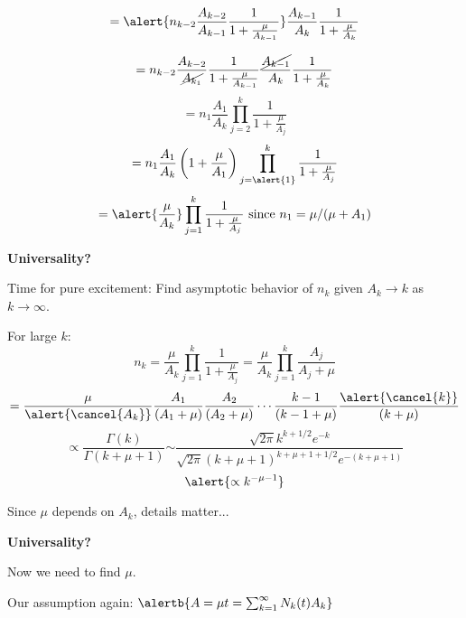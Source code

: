 \begin{frame}[label=]
\begin{frame}[label=]
\begin{frame}[label=]
\begin{frame}[label=]
\begin{frame}[label=]
\begin{frame}[label=]
\begin{frame}[label=]
\begin{frame}[label=]
\begin{frame}[label=]
\begin{frame}[label=]
\begin{frame}[label=]
\begin{frame}[label=]
\begin{frame}[label=]
\begin{frame}[label=]
\begin{frame}[label=]
\begin{frame}[label=]
\begin{frame}[label=]
\begin{frame}[label=]
\begin{frame}[label=]
\begin{frame}[label=]
\begin{frame}[label=]
\begin{frame}[label=]
\begin{frame}[label=]
\begin{frame}[label=]
\begin{overprint}
      $$
      =
      \alert{n_{k-2}
        \frac{A_{k-2}}{A_{k-1}}
        \frac{1}{1 + \frac{\mu}{A_{k-1}}}}
      \frac{A_{k-1}}{A_k}
      \frac{1}{1 + \frac{\mu}{A_k}}
      $$
      
      $$
      =
      n_{k-2}
      \frac{A_{k-2}}{\cancel{A_{k_1}}}
      \frac{1}{1 + \frac{\mu}{A_{k-1}}}
      \frac{\cancel{A_{k-1}}}{A_k}
      \frac{1}{1 + \frac{\mu}{A_k}}
      $$
        {
      $$
      =
      n_{1}
      \frac{A_{1}}{A_k}
      \prod_{j=2}^{k}
      \frac{1}{1 + \frac{\mu}{A_j}}
      $$
    }
    {
      $$
      =
      n_{1}
      \frac{A_{1}}{A_k}
      \left(1 + \frac{\mu}{A_1}\right)
      \prod_{j=\alert{1}}^{k}
      \frac{1}{1 + \frac{\mu}{A_j}}
      $$
    }
    {
      $$
      =
      \alert{\frac{\mu}{A_k}}
      \prod_{j=1}^{k}
      \frac{1}{1 + \frac{\mu}{A_j}}
      \mbox{\ since $n_1 = \mu/(\mu+A_1)$}
      $$
    }
  


  \textbf{Universality?}

  
  
    Time for pure excitement: Find \alert{asymptotic behavior} 
    of $n_k$ given $A_k \rightarrow k$ as $k \rightarrow \infty$.
  
    For large $k$:
    $$
    n_k = 
    \frac{\mu}{A_k}
    \prod_{j=1}^{k}
    \frac{1}{1 + \frac{\mu}{A_j}}
    {
      =
      \frac{\mu}{A_k}
      \prod_{j=1}^{k}
      \frac{A_j}{A_j + \mu}
    }
    $$
    {
    $$
    =
      \frac{\mu}{\alert{\cancel{A_k}}}
      \frac{A_1}{(A_1+\mu)}
      \frac{A_2}{(A_2+\mu)}
      \cdots
      \frac{k-1}{(k-1+\mu)}
      \frac{\alert{\cancel{k}}}{(k+\mu)}
    $$
    }
    $$
    {
      \propto
      \frac{\Gamma(k)}{\Gamma(k + \mu + 1)}
    }
    {
      \sim
      \frac{\sqrt{2\pi} k^{k+1/2} e^{-k}}
      {\sqrt{2\pi} (k+\mu+1)^{k+\mu+1+1/2}e^{-(k+\mu+1)}}
    }
    $$
    $$
    {
      \alert{ \propto k^{-\mu-1} }
    }
    $$
  
    Since $\mu$ depends on $A_k$, \alert{details matter...}
  


  \textbf{Universality?}

  
  
    Now we need to find $\mu$.
  
    Our assumption again:
    $
    \alertb{A = \mu t = \sum_{k=1}^{\infty} N_k(t) A_k}
    $
  

\end{overprint}
\end{frame}
\end{frame}
\end{frame}
\end{frame}
\end{frame}
\end{frame}
\end{frame}
\end{frame}
\end{frame}
\end{frame}
\end{frame}
\end{frame}
\end{frame}
\end{frame}
\end{frame}
\end{frame}
\end{frame}
\end{frame}
\end{frame}
\end{frame}
\end{frame}
\end{frame}
\end{frame}
\end{frame}
